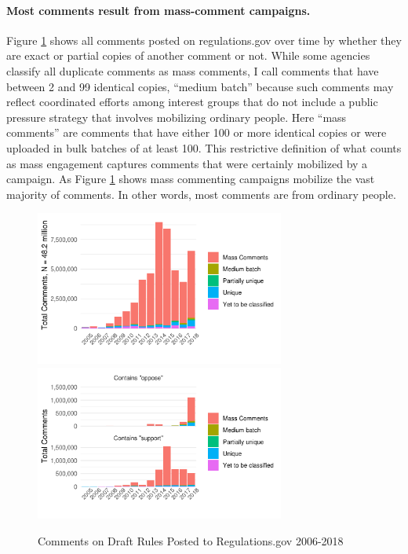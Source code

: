 

\paragraph{Most comments result from mass-comment campaigns.}
Figure \ref{fig:comments-support} shows all comments posted on regulations.gov over time by whether they are exact or partial copies of another comment or not. While some agencies classify all duplicate comments as mass comments, I call comments that have between 2 and 99 identical copies, ``medium batch'' because such comments may reflect coordinated efforts among interest groups that do not include a public pressure strategy that involves mobilizing ordinary people. Here ``mass comments'' are comments that have either 100 or more identical copies or were uploaded in bulk batches of at least 100. This restrictive definition of what counts as mass engagement captures comments that were certainly mobilized by a campaign. As Figure \ref{fig:comments-support} shows mass commenting campaigns mobilize the vast majority of comments. In other words, most comments are from ordinary people.

\begin{figure}[h!]
    \centering
        \caption{Comments on Draft Rules Posted to Regulations.gov 2006-2018}
    \includegraphics[height =2in]{Figs/comments-mass-1.png}
    \includegraphics[height =2in]{Figs/comments-mass-support-vs-oppose-1.png}

    \label{fig:comments-support}
\end{figure}

